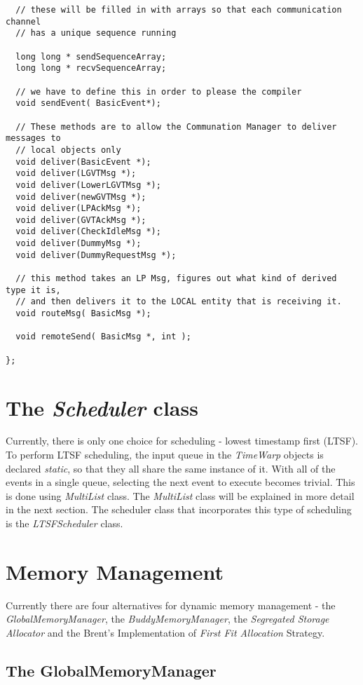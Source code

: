 \documentclass[11pt]{report}
\begin{document}
\begin{verbatim}
  // these will be filled in with arrays so that each communication channel
  // has a unique sequence running

  long long * sendSequenceArray;
  long long * recvSequenceArray;

  // we have to define this in order to please the compiler
  void sendEvent( BasicEvent*);

  // These methods are to allow the Communation Manager to deliver messages to
  // local objects only
  void deliver(BasicEvent *);
  void deliver(LGVTMsg *);
  void deliver(LowerLGVTMsg *);
  void deliver(newGVTMsg *);
  void deliver(LPAckMsg *);
  void deliver(GVTAckMsg *);
  void deliver(CheckIdleMsg *);
  void deliver(DummyMsg *);
  void deliver(DummyRequestMsg *);

  // this method takes an LP Msg, figures out what kind of derived type it is,
  // and then delivers it to the LOCAL entity that is receiving it.
  void routeMsg( BasicMsg *);

  void remoteSend( BasicMsg *, int );

};
\end{verbatim}

\section{The {\it Scheduler} class}

Currently, there is only one choice for scheduling - lowest timestamp
first (LTSF). To perform LTSF scheduling, the input queue in the {\it
TimeWarp} objects is declared {\it static}, so that they all share the
same instance of it.  With all of the events in a single queue, selecting
the next event to execute becomes trivial. This is done using {\it
MultiList} class. The {\it MultiList} class will be explained in more
detail in the next section. The scheduler class that incorporates this
type of scheduling is the {\it LTSFScheduler} class.

\section{Memory Management}

Currently there are four alternatives for dynamic memory management - the
{\it GlobalMemoryManager}, the {\it BuddyMemoryManager}, the {\it
Segregated Storage Allocator} and the Brent's Implementation of {\it First
Fit Allocation} Strategy.

\subsection{The GlobalMemoryManager}
\end{document}
